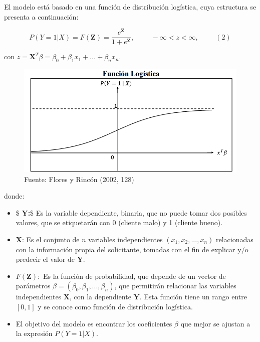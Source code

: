 \documentclass[
  letterpaper,
]{tex/svmono}
\begin{document}
El modelo está basado en una función de distribución logística, cuya
estructura se presenta a continuación:

\[
P(Y = 1 | X) = F(\textbf{Z}) = \frac{e^{\textbf{Z}}}{1 + e^{\textbf{Z}}}, \hspace{1cm} -\infty < z <\infty,\hspace{1cm} (2)
\]

con
\(z = \textbf{X}^T\beta = \beta_0 + \beta_1x_1 + . . . + \beta_nx_n\).

\begin{figure}

{\centering \includegraphics{images/Figura_1.png}

}

\caption{Fuente: Flores y Rincón (2002, 128)}

\end{figure}

donde:

\begin{itemize}
\item
  \$ \textbf{Y:}\$ Es la variable dependiente, binaria, que no puede
  tomar dos posibles valores, que se etiquetarán con 0 (cliente malo) y
  1 (cliente bueno).
\item
  \(\textbf{X:}\) Es el conjunto de \(n\) variables independientes
  \((x_1, x_2, . . . , x_n)\) relacionadas con la información propia del
  solicitante, tomadas con el fin de explicar y/o predecir el valor de
  \(\textbf{Y}\).
\item
  \(F(\textbf{Z}):\) Es la función de probabilidad, que depende de un
  vector de parámetros \(\beta = (\beta_0, \beta_1, . . . , \beta_n)\),
  que permitirán relacionar las variables independientes \(\textbf{X}\),
  con la dependiente \(\textbf{Y}\). Esta función tiene un rango entre
  \([0,1]\) y se conoce como función de distribución logística.
\item
  El objetivo del modelo es encontrar los coeficientes \(\beta\) que
  mejor se ajustan a la expresión \(P(Y = 1|X)\).
\end{itemize}
\end{document}
